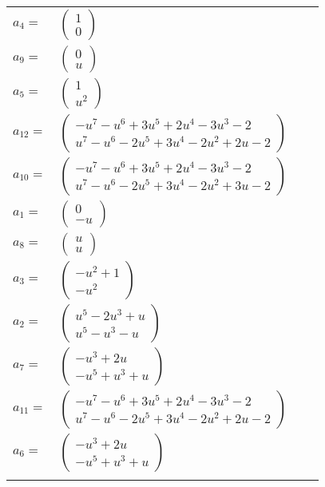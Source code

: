 \documentclass[1p]{elsarticle_modified}
\theoremstyle{definition}
\begin{document}
\begin{tabular}{m{7pt} m{180pt} m{7pt} m{180pt} }
\flushright $a_{4}=$&$\begin{pmatrix}1\\0\end{pmatrix}$ \\
\flushright $a_{9}=$&$\begin{pmatrix}0\\u\end{pmatrix}$ \\
\flushright $a_{5}=$&$\begin{pmatrix}1\\u^2\end{pmatrix}$ \\
\flushright $a_{12}=$&$\begin{pmatrix}- u^7- u^6+3 u^5+2 u^4-3 u^3-2\\u^7- u^6-2 u^5+3 u^4-2 u^2+2 u-2\end{pmatrix}$ \\
\flushright $a_{10}=$&$\begin{pmatrix}- u^7- u^6+3 u^5+2 u^4-3 u^3-2\\u^7- u^6-2 u^5+3 u^4-2 u^2+3 u-2\end{pmatrix}$ \\
\flushright $a_{1}=$&$\begin{pmatrix}0\\- u\end{pmatrix}$ \\
\flushright $a_{8}=$&$\begin{pmatrix}u\\u\end{pmatrix}$ \\
\flushright $a_{3}=$&$\begin{pmatrix}- u^2+1\\- u^2\end{pmatrix}$ \\
\flushright $a_{2}=$&$\begin{pmatrix}u^5-2 u^3+u\\u^5- u^3- u\end{pmatrix}$ \\
\flushright $a_{7}=$&$\begin{pmatrix}- u^3+2 u\\- u^5+u^3+u\end{pmatrix}$ \\
\flushright $a_{11}=$&$\begin{pmatrix}- u^7- u^6+3 u^5+2 u^4-3 u^3-2\\u^7- u^6-2 u^5+3 u^4-2 u^2+2 u-2\end{pmatrix}$ \\
\flushright $a_{6}=$&$\begin{pmatrix}- u^3+2 u\\- u^5+u^3+u\end{pmatrix}$\\&\end{tabular}
\end{document}
